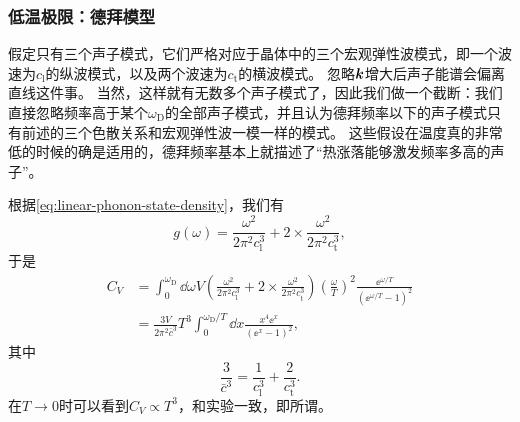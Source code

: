 \subsubsection{低温极限：德拜模型} 

假定只有三个声子模式，它们严格对应于晶体中的三个宏观弹性波模式，即一个波速为$c_\text{l}$的纵波模式，以及两个波速为$c_\text{t}$的横波模式。
忽略$\vb*{k}$增大后声子能谱会偏离直线这件事。
当然，这样就有无数多个声子模式了，因此我们做一个截断：我们直接忽略频率高于某个$\omega_\text{D}$的全部声子模式，并且认为德拜频率以下的声子模式只有前述的三个色散关系和宏观弹性波一模一样的模式。
这些假设在温度真的非常低的时候的确是适用的，德拜频率基本上就描述了“热涨落能够激发频率多高的声子”。

根据\eqref{eq:linear-phonon-state-density}，我们有
\begin{equation}
    g(\omega) = \frac{\omega^2}{2\pi^2 c_\text{l}^3} + 2 \times \frac{\omega^2}{2\pi^2 c_\text{t}^3},
\end{equation}
于是
\begin{equation}
    \begin{aligned}
        C_V &= \int_0^{\omega_\text{D}} \dd{\omega} V \left( \frac{\omega^2}{2\pi^2 c_\text{l}^3} + 2 \times \frac{\omega^2}{2\pi^2 c_\text{t}^3} \right) \left( \frac{\omega}{T} \right)^2 \frac{\ee^{\omega / T}}{(\ee^{\omega / T} - 1)^2} \\
        &= \frac{3V}{2\pi^2 \bar{c}^3} T^3 \int_0^{\omega_\text{D} / T} \dd{x} \frac{x^4 \ee^{x}}{(\ee^x - 1)^2} ,
    \end{aligned}
    \label{eq:debye-special-heat}
\end{equation}
其中
\begin{equation}
    \frac{3}{\bar{c}^3} = \frac{1}{c_\text{l}^3} + \frac{2}{c_\text{t}^3}.
\end{equation}
在$T \to 0$时可以看到$C_V \propto T^3$，和实验一致，即所谓。


